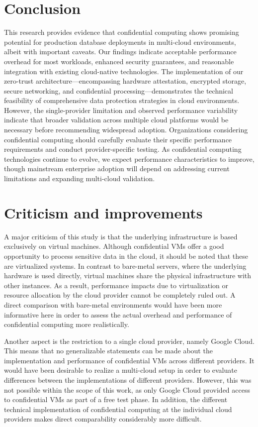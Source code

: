 \section{Conclusion}

This research provides evidence that confidential computing shows promising potential for production database deployments in multi-cloud environments, albeit with important caveats. Our findings indicate acceptable performance overhead for most workloads, enhanced security guarantees, and reasonable integration with existing cloud-native technologies.
The implementation of our zero-trust architecture—encompassing hardware attestation, encrypted storage, secure networking, and confidential processing—demonstrates the technical feasibility of comprehensive data protection strategies in cloud environments. However, the single-provider limitation and observed performance variability indicate that broader validation across multiple cloud platforms would be necessary before recommending widespread adoption.
Organizations considering confidential computing should carefully evaluate their specific performance requirements and conduct provider-specific testing. As confidential computing technologies continue to evolve, we expect performance characteristics to improve, though mainstream enterprise adoption will depend on addressing current limitations and expanding multi-cloud validation.

\section{Criticism and improvements}

A major criticism of this study is that the underlying infrastructure is based exclusively on virtual machines. Although confidential VMs offer a good opportunity to process sensitive data in the cloud, it should be noted that these are virtualized systems. In contrast to bare-metal servers, where the underlying hardware is used directly, virtual machines share the physical infrastructure with other instances. As a result, performance impacts due to virtualization or resource allocation by the cloud provider cannot be completely ruled out. A direct comparison with bare-metal environments would have been more informative here in order to assess the actual overhead and performance of confidential computing more realistically.

Another aspect is the restriction to a single cloud provider, namely Google Cloud. This means that no generalizable statements can be made about the implementation and performance of confidential VMs across different providers. It would have been desirable to realize a multi-cloud setup in order to evaluate differences between the implementations of different providers. However, this was not possible within the scope of this work, as only Google Cloud provided access to confidential VMs as part of a free test phase. In addition, the different technical implementation of confidential computing at the individual cloud providers makes direct comparability considerably more difficult.
